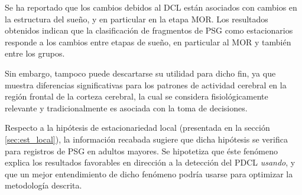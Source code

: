 \documentclass[12pt,letterpaper]{book}
\begin{document}

Se ha reportado que los cambios debidos al DCL están asociados con cambios en la estructura del sueño, y en particular en la etapa MOR.
%
Los resultados obtenidos indican que la clasificación de fragmentos de PSG como estacionarios responde a los cambios entre etapas de sueño, en particular al MOR y también entre los grupos.



Sin embargo, tampoco puede descartarse su utilidad para dicho fin, ya que muestra diferencias significativas para los patrones de actividad cerebral en la región frontal de la corteza cerebral, la cual se considera fisiológicamente relevante y tradicionalmente es asociada con la toma de decisiones.


Respecto a la hipótesis de estacionariedad local (presentada en la sección \ref{sec:est_local}), la información recabada sugiere que dicha hipótesis se verifica para registros de PSG en adultos mayores.
%
%
%
Se hipotetiza que éste fenómeno explica los resultados {favorables} en dirección a la detección del PDCL \textit{usando},
%
y que
un mejor entendimiento de dicho fenómeno podría usarse para 
optimizar la metodología descrita.
%
\end{document}
